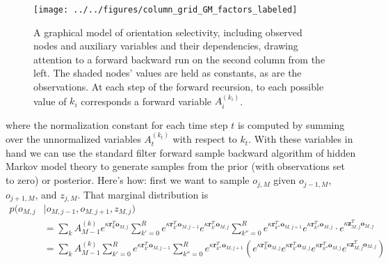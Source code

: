 \documentclass[11pt]{article}
\begin{document}
\begin{figure}[h]
\centering
\texttt{[image: ../../figures/column\_grid\_GM\_factors\_labeled]}
\caption{A graphical model of orientation selectivity, including observed nodes and auxiliary variables and their dependencies, drawing attention to a forward backward run on the second column from the left. The shaded nodes' values are held as constants, as are the observations. At each step of the forward recursion, to each possible value of $k_i$ corresponds a forward variable $A_i^{(k_i)}$.}
\label{fig:som_gm3}
\end{figure}

\noindent where the normalization constant for each time step $t$ is computed by summing over the unnormalized variables $A_t^{(k_t)}$ with respect to $k_t$.  With these variables in hand we can use the standard filter forward sample backward algorithm of hidden Markov model theory to generate samples from the prior (with observations set to zero) or posterior. Here's how: first we want to sample $o_{j,M}$ given $o_{j-1,M}$, $o_{j+1,M}$, and $z_{j,M}$. That marginal distribution is 
%
\begin{align*}
	p(o_{M,j}&|o_{M,j-1},o_{M,j+1},z_{M,j}) \\
	&=\sum_k A_{M-1}^{(k)} e^{\kappa\mathbf{r}_k^T\mathbf{o}_{M,j}}\sum_{k'=0}^R e^{\kappa \mathbf{r}_{k'}^T \mathbf{o}_{M,j-1}} e^{\kappa \mathbf{r}_{k'}^T\mathbf{o}_{M,j}} \sum_{k''=0}^R e^{\kappa \mathbf{r}_{k''}^T \mathbf{o}_{M,j+1}} e^{\kappa \mathbf{r}_{k''}^T\mathbf{o}_{M,j}} \cdot e^{\kappa \mathbf{z}_{M,j}^T \mathbf{o}_{M,j}} \\
	&=\sum_k A_{M-1}^{(k)} \sum_{k'=0}^R e^{\kappa \mathbf{r}_{k'}^T \mathbf{o}_{M,j-1}} \sum_{k''=0}^R e^{\kappa \mathbf{r}_{k''}^T \mathbf{o}_{M,j+1}}\left( e^{\kappa\mathbf{r}_k^T\mathbf{o}_{M,j}} e^{\kappa \mathbf{r}_{k'}^T\mathbf{o}_{M,j}} e^{\kappa \mathbf{r}_{k''}^T\mathbf{o}_{M,j}} e^{\kappa \mathbf{z}_{M,j}^T \mathbf{o}_{M,j}}\right) 
\end{align*}
\end{document}
